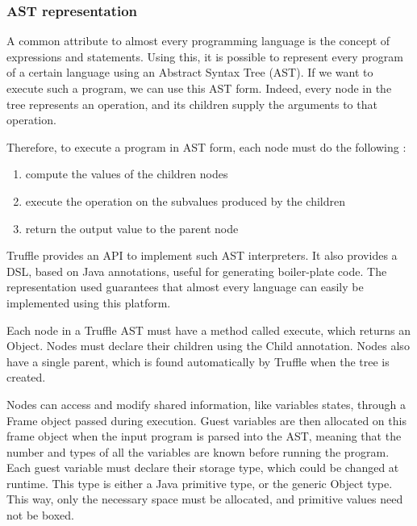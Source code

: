 \documentclass[twoside,11pt,a4paper]{article}
\newcommand{\java}[1]{\textsf{#1}}
\begin{document}
\subsubsection{AST representation}


A common attribute to almost every programming language is the concept of expressions and statements. Using this, it is possible to represent every program of a certain language using an Abstract Syntax Tree (AST). If we want to execute such a program, we can use this AST form. Indeed, every node in the tree represents an operation, and its children supply the arguments to that operation.

Therefore, to execute a program in AST form, each node must do the following :
\begin{enumerate}
\item compute the values of the children nodes
\item execute the operation on the subvalues produced by the children
\item return the output value to the parent node
\end{enumerate}


Truffle provides an API to implement such AST interpreters. It also provides a DSL, based on Java annotations, useful for generating boiler-plate code. The representation used guarantees that almost every language can easily be implemented using this platform.

Each node in a Truffle AST must have a method called \java{execute}, which returns an \java{Object}. Nodes must declare their children using the \java{Child} annotation. Nodes also have a single parent, which is found automatically by Truffle when the tree is created.

Nodes can access and modify shared information, like variables states, through a \java{Frame} object passed during execution. Guest variables are then allocated on this frame object when the input program is parsed into the AST, meaning that the number and types of all the variables are known before running the program. Each guest variable must declare their storage type, which could be changed at runtime. This type is either a Java primitive type, or the generic \java{Object} type. This way, only the necessary space must be allocated, and primitive values need not be boxed.
\end{document}
